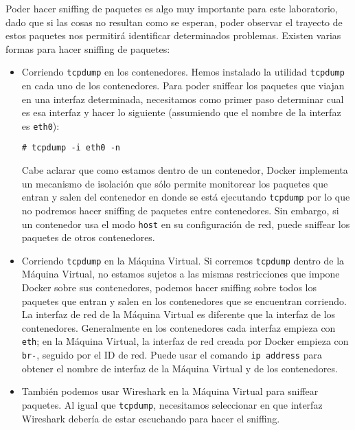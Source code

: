 
Poder hacer sniffing de paquetes es algo muy importante para este laboratorio, dado que si las cosas no resultan como se esperan, poder observar el trayecto de estos paquetes nos permitirá identificar determinados problemas.
Existen varias formas para hacer sniffing de paquetes:

\begin{itemize}
\item Corriendo \texttt{tcpdump} en los contenedores.
Hemos instalado la utilidad \texttt{tcpdump} en cada uno de los contenedores. Para poder sniffear los paquetes que viajan en una interfaz determinada, necesitamos como primer paso determinar cual es esa interfaz y hacer lo siguiente (assumiendo que el nombre de la interfaz es \texttt{eth0}):

\begin{lstlisting}
# tcpdump -i eth0 -n
\end{lstlisting}

Cabe aclarar que como estamos dentro de un contenedor, Docker implementa un mecanismo de isolación que sólo permite monitorear los paquetes que entran y salen del contenedor en donde se está ejecutando \texttt{tcpdump} por lo que no podremos hacer sniffing de paquetes entre contenedores.
Sin embargo, si un contenedor usa el modo \texttt{host} en su configuración de red, puede sniffear los paquetes de otros contenedores.

\item Corriendo \texttt{tcpdump} en la Máquina Virtual. Si corremos \texttt{tcpdump} dentro de la Máquina Virtual, no estamos sujetos a las mismas restricciones que impone Docker sobre sus contenedores, podemos hacer sniffing sobre todos los paquetes que entran y salen en los contenedores que se encuentran corriendo. La interfaz de red de la Máquina Virtual es diferente que la interfaz de los contenedores.
Generalmente en los contenedores cada interfaz empieza con \texttt{eth}; en la Máquina Virtual, la interfaz de red creada por Docker empieza con \texttt{br-}, seguido por el ID de red.
Puede usar el comando \texttt{ip address} para obtener el nombre de interfaz de la Máquina Virtual y de los contenedores.

\item También podemos usar Wireshark en la Máquina Virtual para sniffear paquetes. Al igual que \texttt{tcpdump}, necesitamos seleccionar en que interfaz Wireshark debería de estar escuchando para hacer el sniffing.
\end{itemize}

